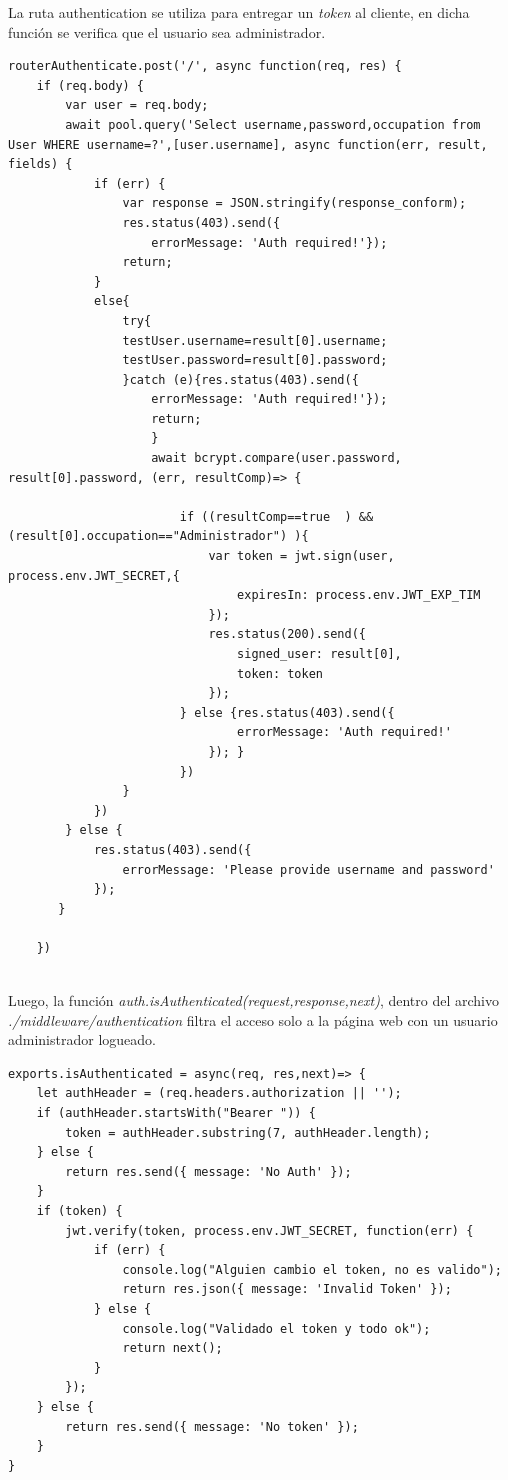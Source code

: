 La ruta authentication se utiliza para entregar un \textit{token} al cliente, en dicha función se verifica que el usuario sea administrador.

\begin{lstlisting}[caption=  Logueo web]
routerAuthenticate.post('/', async function(req, res) {
    if (req.body) {
        var user = req.body;
        await pool.query('Select username,password,occupation from User WHERE username=?',[user.username], async function(err, result, fields) {
            if (err) {
                var response = JSON.stringify(response_conform);
                res.status(403).send({
                    errorMessage: 'Auth required!'});
                return;    
            }
            else{
                try{
                testUser.username=result[0].username;
                testUser.password=result[0].password;
                }catch (e){res.status(403).send({
                    errorMessage: 'Auth required!'});
                    return;    
                    }
                    await bcrypt.compare(user.password, result[0].password, (err, resultComp)=> {

                        if ((resultComp==true  ) &&(result[0].occupation=="Administrador") ){
                            var token = jwt.sign(user, process.env.JWT_SECRET,{
                                expiresIn: process.env.JWT_EXP_TIM
                            });
                            res.status(200).send({
                                signed_user: result[0],
                                token: token
                            });
                        } else {res.status(403).send({
                                errorMessage: 'Auth required!'
                            }); }
                        })                    
                }      
            }) 
        } else {
            res.status(403).send({
                errorMessage: 'Please provide username and password'
            });
       }

    })


\end{lstlisting}


Luego, la función \textit{auth.isAuthenticated(request,response,next)}, dentro del archivo \textit{./middleware/authentication} filtra el acceso solo a la página web con un usuario administrador logueado.
\begin{lstlisting}[caption=  Control de token]
exports.isAuthenticated = async(req, res,next)=> {
    let authHeader = (req.headers.authorization || '');
    if (authHeader.startsWith("Bearer ")) {
        token = authHeader.substring(7, authHeader.length);
    } else {
        return res.send({ message: 'No Auth' });
    }
    if (token) {
        jwt.verify(token, process.env.JWT_SECRET, function(err) {
            if (err) {
                console.log("Alguien cambio el token, no es valido");
                return res.json({ message: 'Invalid Token' });
            } else {
                console.log("Validado el token y todo ok");
                return next();
            }
        });
    } else {
        return res.send({ message: 'No token' });
    }
}
\end{lstlisting}

